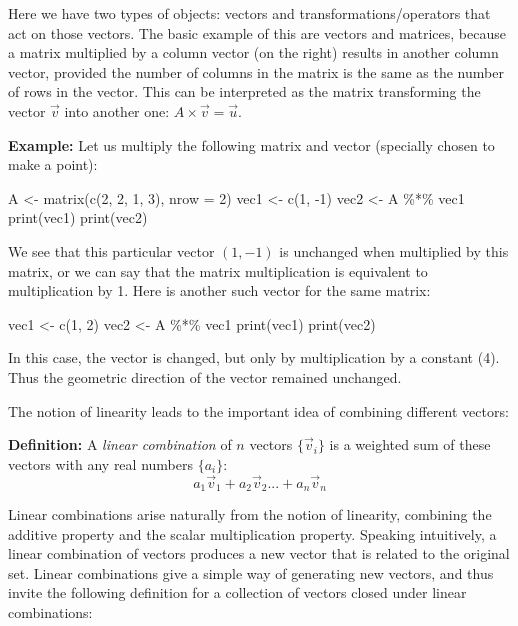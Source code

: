\documentclass[
  letterpaper,
  DIV=11,
  numbers=noendperiod]{scrreprt}
\newenvironment{Shaded}{\begin{snugshade}}{\end{snugshade}}
\newcommand{\NormalTok}[1]{\textcolor[rgb]{0.00,0.23,0.31}{#1}}
\begin{document}
Here we have two types of objects: vectors and transformations/operators
that act on those vectors. The basic example of this are vectors and
matrices, because a matrix multiplied by a column vector (on the right)
results in another column vector, provided the number of columns in the
matrix is the same as the number of rows in the vector. This can be
interpreted as the matrix transforming the vector \(\vec v\) into
another one: \(A \times \vec v = \vec u\).

\textbf{Example:} Let us multiply the following matrix and vector
(specially chosen to make a point):

\begin{Shaded}
\begin{Highlighting}[]
\NormalTok{A \textless{}{-} matrix(c(2, 2, 1, 3), nrow = 2)}
\NormalTok{vec1 \textless{}{-} c(1, {-}1)}
\NormalTok{vec2 \textless{}{-} A \%*\% vec1}
\NormalTok{print(vec1)}
\NormalTok{print(vec2)}
\end{Highlighting}
\end{Shaded}

We see that this particular vector \((1,-1)\) is unchanged when
multiplied by this matrix, or we can say that the matrix multiplication
is equivalent to multiplication by 1. Here is another such vector for
the same matrix:

\begin{Shaded}
\begin{Highlighting}[]
\NormalTok{vec1 \textless{}{-} c(1, 2)}
\NormalTok{vec2 \textless{}{-} A \%*\% vec1}
\NormalTok{print(vec1)}
\NormalTok{print(vec2)}
\end{Highlighting}
\end{Shaded}

In this case, the vector is changed, but only by multiplication by a
constant (4). Thus the geometric direction of the vector remained
unchanged.

The notion of linearity leads to the important idea of combining
different vectors:

\textbf{Definition:} A \emph{linear combination} of \(n\) vectors
\(\{ \vec v_i \}\) is a weighted sum of these vectors with any real
numbers \(\{a_i\}\): \[ a_1 \vec v_1+ a_2 \vec v_2... + a_n \vec v_n\]

Linear combinations arise naturally from the notion of linearity,
combining the additive property and the scalar multiplication property.
Speaking intuitively, a linear combination of vectors produces a new
vector that is related to the original set. Linear combinations give a
simple way of generating new vectors, and thus invite the following
definition for a collection of vectors closed under linear combinations:
\end{document}
